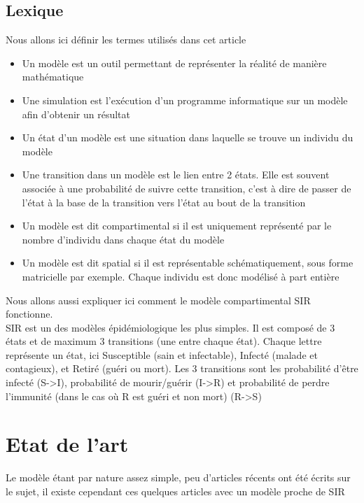 \documentclass[journal, a4paper]{IEEEtran}
\begin{document}
	\subsection{Lexique}
	Nous allons ici définir les termes utilisés dans cet article
	\begin{itemize}
		\item Un modèle est un outil permettant de représenter la réalité de manière mathématique
		\item Une simulation est l'exécution d'un programme informatique sur un modèle afin d'obtenir un résultat
		\item Un état d'un modèle est une situation dans laquelle se trouve un individu du modèle
		\item Une transition dans un modèle est le lien entre 2 états. Elle est souvent associée à une probabilité de suivre cette transition, c'est à dire de passer de l'état à la base de la transition vers l'état au bout de la transition
		\item Un modèle est dit compartimental si il est uniquement représenté par le nombre d'individu dans chaque état du modèle
		\item Un modèle est dit spatial si il est représentable schématiquement, sous forme matricielle par exemple. Chaque individu est donc modélisé à part entière
	\end{itemize}
	Nous allons aussi expliquer ici comment le modèle compartimental SIR fonctionne. \\
	SIR est un des modèles épidémiologique les plus simples. Il est composé de 3 états et de maximum 3 transitions (une entre chaque état). Chaque lettre représente un état, ici Susceptible (sain et infectable), Infecté (malade et contagieux), et Retiré (guéri ou mort). Les 3 transitions sont les probabilité d'être infecté (S->I), probabilité de mourir/guérir (I->R) et probabilité de perdre l'immunité (dans le cas où R est guéri et non mort) (R->S)

\section{Etat de l'art}
	Le modèle étant par nature assez simple, peu d'articles récents ont été écrits sur le sujet, il existe cependant ces quelques articles avec un modèle proche de SIR
\end{document}
